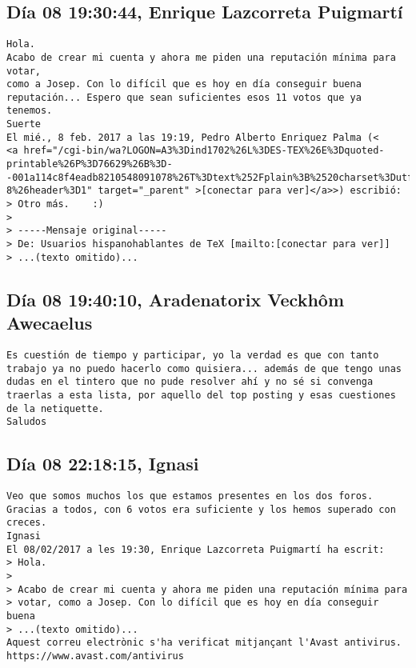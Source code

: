\documentclass[a4paper,10pt]{article}
\begin{document}
\subsection{Día 08 19:30:44, Enrique Lazcorreta Puigmartí}

\begin{lstlisting}
Hola.
Acabo de crear mi cuenta y ahora me piden una reputación mínima para votar,
como a Josep. Con lo difícil que es hoy en día conseguir buena
reputación... Espero que sean suficientes esos 11 votos que ya tenemos.
Suerte
El mié., 8 feb. 2017 a las 19:19, Pedro Alberto Enriquez Palma (<
<a href="/cgi-bin/wa?LOGON=A3%3Dind1702%26L%3DES-TEX%26E%3Dquoted-printable%26P%3D76629%26B%3D--001a114c8f4eadb8210548091078%26T%3Dtext%252Fplain%3B%2520charset%3Dutf-8%26header%3D1" target="_parent" >[conectar para ver]</a>>) escribió:
> Otro más.    :)
>
> -----Mensaje original-----
> De: Usuarios hispanohablantes de TeX [mailto:[conectar para ver]]
> ...(texto omitido)...

\end{lstlisting}

\subsection{Día 08 19:40:10, Aradenatorix Veckhôm Awecaelus}

\begin{lstlisting}
Es cuestión de tiempo y participar, yo la verdad es que con tanto
trabajo ya no puedo hacerlo como quisiera... además de que tengo unas
dudas en el tintero que no pude resolver ahí y no sé si convenga
traerlas a esta lista, por aquello del top posting y esas cuestiones
de la netiquette.
Saludos

\end{lstlisting}

\subsection{Día 08 22:18:15, Ignasi}

\begin{lstlisting}
Veo que somos muchos los que estamos presentes en los dos foros.
Gracias a todos, con 6 votos era suficiente y los hemos superado con creces.
Ignasi
El 08/02/2017 a les 19:30, Enrique Lazcorreta Puigmartí ha escrit:
> Hola.
>
> Acabo de crear mi cuenta y ahora me piden una reputación mínima para 
> votar, como a Josep. Con lo difícil que es hoy en día conseguir buena 
> ...(texto omitido)...
Aquest correu electrònic s'ha verificat mitjançant l'Avast antivirus.
https://www.avast.com/antivirus

\end{lstlisting}
\end{document}
